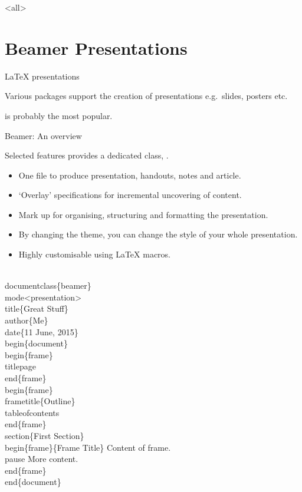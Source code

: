 \mode<all>
\overleaf
\mode*

\section{Beamer Presentations}

\begin{frame}{\LaTeX{} presentations}

  Various packages support the creation of presentations e.g.~slides, posters etc.

   is probably the most popular.

\end{frame}

\begin{frame}{Beamer: An overview}

  \begin{block}{Selected features}
	 provides a dedicated class, .
	\begin{itemize}
	  \item One file to produce presentation, handouts, notes and article.
	  \item ‘Overlay’ specifications for incremental uncovering of content.
	  \item Mark up for organising, structuring and formatting the presentation.
	  \item By changing the theme, you can change the style of your whole presentation.
	  \item Highly customisable using \LaTeX{} macros.
	\end{itemize}
  \end{block}

\end{frame}

\begin{frame}
	\begin{semiverbatim}
		\\documentclass\{\alert<2>{beamer}\}
		\alert<3>{\\mode<presentation>}
		\\title\{Great Stuff\}
		\\author\{Me\}
		\\date\{11 June, 2015\}
		\\begin\{document\}
		\alert<4>{\\begin\{frame\}}
		  \alert<5>{\\titlepage}
		\alert<4>{\\end\{frame\}}
		\\begin\{frame\}
		  \alert<7>{\\frametitle\{Outline\}}
		  \alert<6>{\\tableofcontents}
		\\end\{frame\}
		\\section\{First Section\}
		\\begin\{frame\}\alert<7>{\{Frame Title\}}
		  Content of frame.
		  \alert<8>{\\pause} More content.
		\\end\{frame\}
		\\end\{document\}
	\end{semiverbatim}
\end{frame}


